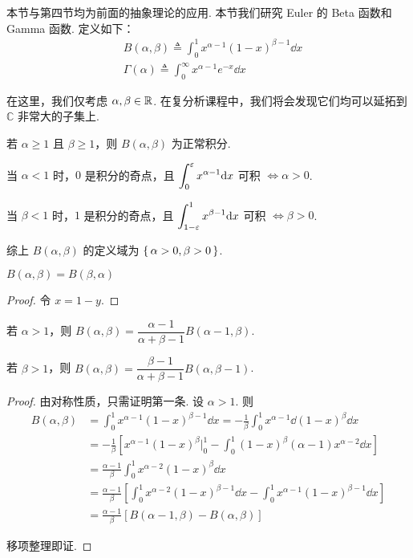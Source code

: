 本节与第四节均为前面的抽象理论的应用. 本节我们研究 Euler 的 Beta 函数和 Gamma 函数. 定义如下：
$$
\begin{aligned}
    &B(\alpha,\beta)\triangleq\int_0^1x^{\alpha-1}(1-x)^{\beta-1}\dd x\\
    &\Gamma(\alpha)\triangleq\int_0^\infty x^{\alpha-1}e^{-x}\dd x
\end{aligned}
$$

在这里，我们仅考虑 $\alpha,\beta\in\mathbb{R}$. 在复分析课程中，我们将会发现它们均可以延拓到 $\mathbb{C}$ 非常大的子集上.



若 $\alpha\ge 1$ 且 $\beta\ge 1$，则 $B(\alpha,\beta)$ 为正常积分.

当 $\alpha<1$ 时，$0$ 是积分的奇点，且 $\displaystyle\int_0^\varepsilon x^{\alpha-1}\mathrm{d} x$ 可积 $\iff\alpha>0$.

当 $\beta<1$ 时，$1$ 是积分的奇点，且 $\displaystyle\int_{1-\varepsilon}^1 x^{\beta-1}\mathrm{d} x$ 可积 $\iff\beta>0$.

综上 $B(\alpha,\beta)$ 的定义域为 $\set{\alpha>0,\beta>0}$.


\begin{property}
    $B(\alpha,\beta)=B(\beta,\alpha)$
\end{property}
\begin{proof}
    令 $x=1-y$.
\end{proof}


\begin{property}
    若 $\alpha>1$，则 $B(\alpha,\beta)=\dfrac{\alpha-1}{\alpha+\beta-1}B(\alpha-1,\beta)$.

    若 $\beta>1$，则 $B(\alpha,\beta)=\dfrac{\beta-1}{\alpha+\beta-1}B(\alpha,\beta-1)$.
\end{property}
\begin{proof}
    由对称性质，只需证明第一条. 设 $\alpha>1$. 则
$$
\begin{aligned}
    B(\alpha,\beta)&=\int_0^1x^{\alpha-1}(1-x)^{\beta-1}\dd x=-\frac{1}{\beta}\int_0^1x^{\alpha-1}\dd(1-x)^\beta\dd x\\
    &=-\frac{1}{\beta}\left[x^{\alpha-1}(1-x)^\beta\biggr |_0^1-\int_0^1(1-x)^\beta(\alpha-1)x^{\alpha-2}\dd x\right]\\
    &=\frac{\alpha-1}{\beta}\int_0^1x^{\alpha-2}(1-x)^\beta\dd x\\
    &=\frac{\alpha-1}{\beta}\left[\int_0^1x^{\alpha-2}(1-x)^{\beta-1}\dd x-\int_0^1x^{\alpha-1}(1-x)^{\beta-1}\dd x\right]\\
    &=\frac{\alpha-1}{\beta}[B(\alpha-1,\beta)-B(\alpha,\beta)]
\end{aligned}
$$

    移项整理即证.
\end{proof}

